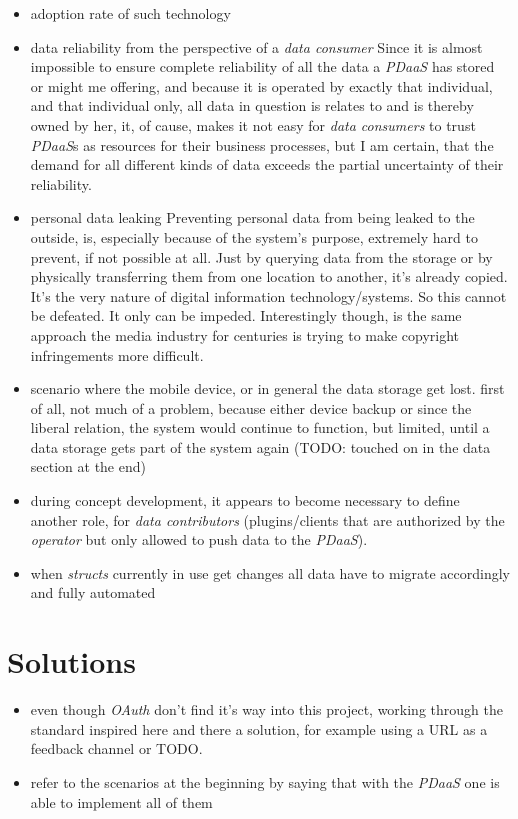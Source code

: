 \documentclass[12pt,english,a4paper,titlepage,cleardoublepage=empty,dottedtoc]{report}
\begin{document}
\begin{itemize}
\item
  adoption rate of such technology
\item
  data reliability from the perspective of a \emph{data consumer} Since
  it is almost impossible to ensure complete reliability of all the data
  a \emph{PDaaS} has stored or might me offering, and because it is
  operated by exactly that individual, and that individual only, all
  data in question is relates to and is thereby owned by her, it, of
  cause, makes it not easy for \emph{data consumers} to trust
  \emph{PDaaS}s as resources for their business processes, but I am
  certain, that the demand for all different kinds of data exceeds the
  partial uncertainty of their reliability.
\item
  personal data leaking Preventing personal data from being leaked to
  the outside, is, especially because of the system's purpose, extremely
  hard to prevent, if not possible at all. Just by querying data from
  the storage or by physically transferring them from one location to
  another, it's already copied. It's the very nature of digital
  information technology/systems. So this cannot be defeated. It only
  can be impeded. Interestingly though, is the same approach the media
  industry for centuries is trying to make copyright infringements more
  difficult.
\item
  scenario where the mobile device, or in general the data storage get
  lost. first of all, not much of a problem, because either device
  backup or since the liberal relation, the system would continue to
  function, but limited, until a data storage gets part of the system
  again (TODO: touched on in the data section at the end)
\item
  during concept development, it appears to become necessary to define
  another role, for \emph{data contributors} (plugins/clients that are
  authorized by the \emph{operator} but only allowed to push data to the
  \emph{PDaaS}).
\item
  when \emph{structs} currently in use get changes all data have to
  migrate accordingly and fully automated
\end{itemize}

\section{Solutions}\label{solutions}

\begin{itemize}
\item
  even though \emph{OAuth} don't find it's way into this project,
  working through the standard inspired here and there a solution, for
  example using a URL as a feedback channel or TODO.
\item
  refer to the scenarios at the beginning by saying that with the
  \emph{PDaaS} one is able to implement all of them
\end{itemize}
\end{document}
